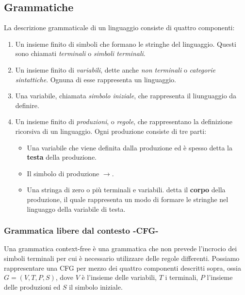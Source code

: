 \documentclass[11pt]{article}
\begin{document}
\subsection{Grammatiche}
La descrizione grammaticale di un linguaggio consiste di quattro componenti:
\begin{enumerate}
	\item Un insieme finito di simboli che formano le stringhe del linguaggio. Questi sono chiamati \textit{terminali} o \textit{simboli terminali}.
	\item Un insieme finito di \textit{variabili}, dette anche \textit{non terminali} o \textit{categorie sintattiche}. Ognuna di esse rappresenta un linguaggio.
	\item Una variabile, chiamata \textit{simbolo iniziale}, che rappresenta il liunguaggio da definire.
	\item Un insieme finito di \textit{produzioni}, o \textit{regole}, che rappresentano la definizione ricorsiva di un linguaggio. Ogni produzione consiste di tre parti:
	\begin{itemize}
		\item Una variabile che viene definita dalla produzione ed è spesso detta la \textbf{testa} della produzione.
		\item Il simbolo di produzione $\rightarrow$.
		\item Una stringa di zero o più terminali e variabili. detta il \textbf{corpo} della produzione, il quale rappresenta un modo di formare le stringhe nel linguaggo della variabile di testa. 
	\end{itemize}
\end{enumerate}
\subsubsection{Grammatica libere dal contesto -CFG-}
Una grammatica context-free è una grammatica che non prevede l'incrocio dei simboli terminali per cui è necessario utilizzare delle regole differenti. Possiamo rappresentare una CFG per mezzo dei quattro componenti descritti sopra, ossia $G=(V,T,P,S)$, dove $V$ è l'insieme delle variabili, $T$ i terminali, $P$ l'insieme delle produzioni ed $S$ il simbolo iniziale.
\\ \\
\end{document}
